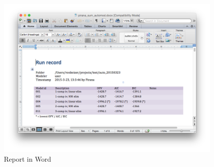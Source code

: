 \begin{figure}[htbp]
\centering
\includegraphics[scale=0.5]{images/report.png}
\caption{Report in Word}
\end{figure}
